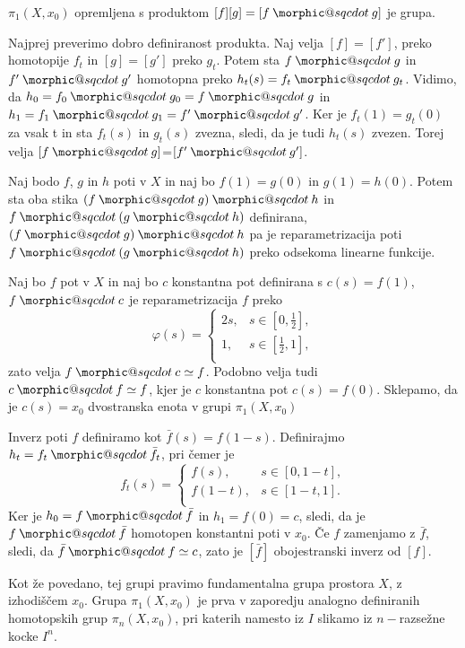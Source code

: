 \documentclass[mat1]{fmfdelo}
\makeatletter
\DeclareRobustCommand{\sqcdot}{\mathbin{\mathpalette\morphic@sqcdot\relax}}
\newcommand{\morphic@sqcdot}[2]{%
\sbox\z@{$\m@th#1\centerdot$}%
\ht\z@=.33333\ht\z@
\vcenter{\box\z@}%
}
\makeatother
\begin{document}
    \begin{izrek}
        $\pi_1(X,x_0)$ opremljena s produktom $[f][g] = [f\sqcdot g]$ je grupa.
    \end{izrek}



\begin{dokaz}
    Najprej preverimo dobro definiranost produkta. Naj velja $[f]=[f']$, preko homotopije $f_t$ in $[g]=[g']$ preko $g_t$. Potem sta $f\sqcdot g$ in $f'\sqcdot g'$ homotopna preko
    $h_t(s) =f_t \sqcdot g_t$. Vidimo, da $h_0=f_0 \sqcdot g_0=f \sqcdot g$ in $h_1=f_1 \sqcdot g_1=f'\sqcdot g'$. Ker je $f_t(1)=g_t(0)$ za vsak t in sta $f_t(s)$ in $g_t(s)$ zvezna, sledi, da je tudi $h_t(s)$ zvezen. Torej velja $[f\sqcdot g]$=$[f'\sqcdot g']$.
    
    Naj bodo $f$, $g$ in $h$ poti v $X$ in naj bo $f(1)=g(0)$ in 
    $g(1)=h(0)$. Potem sta oba stika $(f\sqcdot g) \sqcdot h$ in 
    $f\sqcdot (g \sqcdot h)$ definirana, $(f\sqcdot g) \sqcdot h$ pa je
    reparametrizacija poti $f\sqcdot (g \sqcdot h)$ preko odsekoma linearne 
         funkcije.


Naj bo $f$ pot v $X$ in naj bo $c$ konstantna pot definirana s $c(s)=f(1)$, $f\sqcdot c$ je reparametrizacija $f$ preko 
$$\varphi(s)=\begin{cases}
2s, &s \in [0,\frac{1}{2}], \\
1, & s \in [\frac{1}{2},1],\\
\end{cases}
$$zato velja $f\sqcdot c\simeq f$. Podobno velja tudi  $c\sqcdot f\simeq f$, kjer je $c$ konstantna pot $c(s)=f(0)$. Sklepamo, da je $c(s)=x_0$ dvostranska enota v grupi  $\pi_1(X,x_0)$
     
Inverz poti $f$ definiramo kot $\bar{f}(s)=f(1-s)$. Definirajmo $h_t=f_t\sqcdot \bar{f_t}$, pri čemer je 
$$
f_t(s)=
\begin{cases}
    f(s), &s \in [0,1-t], \\
    f(1-t), & s \in [1-t,1]. \\
\end{cases}
$$
Ker je $h_0=f\sqcdot \bar{f}$ in $h_1=f(0)=c$, sledi, da je $f\sqcdot \bar{f}$ homotopen konstantni poti v $x_0$. Če $f$ zamenjamo z $\bar{f}$, sledi, da $\bar{f}\sqcdot f\simeq c$, zato je $[\bar{f}]$ obojestranski inverz od $[f]$.
\end{dokaz}


Kot že povedano, tej grupi pravimo fundamentalna grupa prostora $X$, z izhodiščem $x_0$. Grupa $\pi_1(X,x_0)$ je prva v zaporedju analogno definiranih homotopskih grup $\pi_n(X,x_0)$, pri katerih namesto iz $I$ slikamo iz $n-$razsežne kocke $I^n$.
\end{document}
